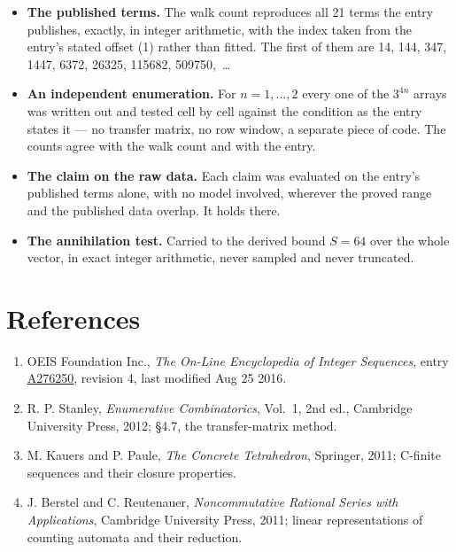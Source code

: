\documentclass[11pt]{article}
\theoremstyle{definition}
\begin{document}
\begin{itemize}

\item {\bfseries The published terms.} The walk count reproduces all 21 terms the entry publishes, exactly, in integer arithmetic, with the index taken from the entry's stated offset (1) rather than fitted. The first of them are 14, 144, 347, 1447, 6372, 26325, 115682, 509750,~\dots

\item {\bfseries An independent enumeration.} For $n = 1,\dots,2$ every one of the $3^{4n}$ arrays was written out and tested cell by cell against the condition as the entry states it --- no transfer matrix, no row window, a separate piece of code. The counts agree with the walk count and with the entry.

\item {\bfseries The claim on the raw data.} Each claim was evaluated on the entry's published terms alone, with no model involved, wherever the proved range and the published data overlap. It holds there.

\item {\bfseries The annihilation test.} Carried to the derived bound $S = 64$ over the whole vector, in exact integer arithmetic, never sampled and never truncated.

\end{itemize}

\section{References}

\begin{enumerate}

\item OEIS Foundation Inc., \emph{The On-Line Encyclopedia of Integer Sequences}, entry \href{https://oeis.org/A276250}{A276250}, revision 4, last modified Aug 25 2016.

\item R. P. Stanley, \emph{Enumerative Combinatorics}, Vol.~1, 2nd ed., Cambridge University Press, 2012; \S4.7, the transfer-matrix method.

\item M. Kauers and P. Paule, \emph{The Concrete Tetrahedron}, Springer, 2011; C-finite sequences and their closure properties.

\item J. Berstel and C. Reutenauer, \emph{Noncommutative Rational Series with Applications}, Cambridge University Press, 2011; linear representations of counting automata and their reduction.

\end{enumerate}
\end{document}
